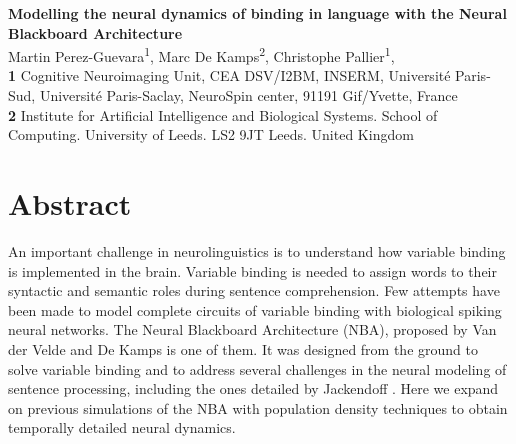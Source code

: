 \documentclass[10pt]{article}
\date{}
\begin{document}
\vspace*{0.2in}

\begin{flushleft}
{\LARGE
\textbf{Modelling the neural dynamics of binding in language with the Neural
Blackboard Architecture}
}
\newline
\\

%
%
Martin Perez-Guevara\textsuperscript{1},
Marc De Kamps\textsuperscript{2},
Christophe Pallier\textsuperscript{1},
\\
\bigskip
\textbf{1} Cognitive Neuroimaging Unit, CEA DSV/I2BM, INSERM, Université Paris-Sud, Université Paris-Saclay, NeuroSpin center, 91191 Gif/Yvette, France
\\
\textbf{2} Institute for Artificial Intelligence and Biological Systems. School of Computing. University of Leeds. LS2 9JT Leeds. United Kingdom
\\
\bigskip

\end{flushleft}


\section*{Abstract}
An important challenge in neurolinguistics is to understand how variable
binding is implemented in the brain. Variable binding is needed to
assign words to their syntactic and semantic roles during sentence
comprehension. Few attempts have been made to model complete circuits of
variable binding with biological spiking neural networks. The Neural
Blackboard Architecture (NBA), proposed by Van der Velde and De Kamps
\cite{vandervelde2006} is one of them. It was designed from the ground to
solve variable binding and to address several challenges in the neural
modeling of sentence processing, including the ones detailed by
Jackendoff \cite{Jackendoff2002}. Here we expand on previous simulations of
the NBA with population density techniques to obtain temporally detailed
neural dynamics.
\end{document}
